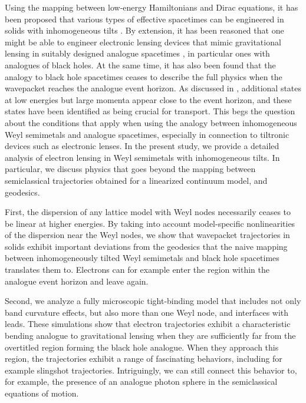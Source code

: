 \documentclass[submission, Phys]{SciPost}
\begin{document}
Using the mapping between low-energy Hamiltonians and Dirac equations, it has been proposed that various types of effective spacetimes can be engineered in solids with inhomogeneous tilts \cite{Weststrom_2017,Liang2019}. By extension, it has been reasoned that one might be able to engineer electronic lensing devices that mimic gravitational lensing in suitably designed analogue spacetimes \cite{Weststrom_2017,Guan_2017,Gorbar2017}, in particular ones with analogues of black holes. At the same time, it has also been found that the analogy to black hole spacetimes ceases to describe the full physics when the wavepacket reaches the analogue event horizon. As discussed in \cite{De_Beule_2021,Sabsovich_2022}, additional states at low energies but large momenta appear close to the event horizon, and these states have been identified as being crucial for transport. This begs the question about the conditions that apply when using the analogy between inhomogeneous Weyl semimetals and analogue spacetimes, especially in connection to tiltronic devices such as electronic lenses. In the present study, we provide a detailed analysis of electron lensing in Weyl semimetals with inhomogeneous tilts. In particular, we  discuss physics that goes beyond the mapping between semiclassical trajectories obtained for a linearized continuum model, and geodesics.

First, the dispersion of any lattice model with Weyl nodes necessarily ceases to be linear at higher energies.
By taking into account model-specific nonlinearities of the dispersion near the Weyl nodes, we show that wavepacket trajectories in solids exhibit important deviations from the geodesics that the naive mapping between inhomogeneously tilted Weyl semimetals and black hole spacetimes translates them to.
Electrons can for example enter the region within the analogue event horizon and leave again.

Second, we analyze a fully microscopic tight-binding model that includes not only band curvature effects, but also more than one Weyl node, and interfaces with leads. These simulations show that electron trajectories exhibit a characteristic bending analogue to gravitational lensing when they are sufficiently far from the overtitled region forming the black hole analogue. When they approach this region, the trajectories exhibit a range of fascinating behaviors, including for example slingshot trajectories. Intriguingly, we can still connect this behavior to, for example, the presence of an analogue photon sphere in the semiclassical equations of motion. 
\end{document}
